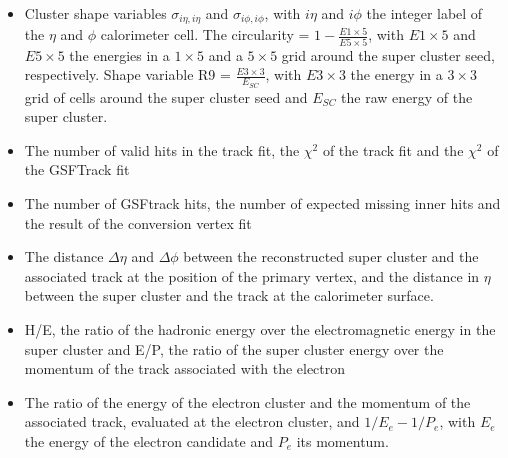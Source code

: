 \begin{itemize}
\setlength{\itemsep}{-\baselineskip}
\item Cluster shape variables $\sigma_{i\eta,i\eta}$ and $\sigma_{i\phi,i\phi}$, with $i\eta$ and $i\phi$ the integer
label of the $\eta$ and $\phi$ calorimeter cell. The circularity =  $1 -\frac{E1\times5}{E5\times5}$, with
$E1\times5$ and $E5\times5$ the energies in a $1\times5$ and a $5\times5$ grid around the super cluster seed,
respectively. Shape variable R9 = $\frac{E3\times3}{E_{SC}}$, with $E3\times3$ the energy in a $3\times3$ grid
of cells around the super cluster seed and $E_{SC}$ the raw energy of the super cluster.
\item The number of valid hits in the track fit, the $\chi^2$ of the track fit and the $\chi^2$ of the GSFTrack fit
\item The number of GSFtrack hits, the number of expected missing inner hits and the result of the conversion vertex fit
\item The distance $\Delta \eta$ and $\Delta \phi$ between the reconstructed super cluster and the associated track at the position of the primary vertex, and the distance in $\eta$ between the super cluster and the track at the calorimeter surface.
\item H/E, the ratio of the hadronic energy over the electromagnetic energy in the super cluster and E/P, the ratio of the super cluster energy over the momentum of the track associated with the electron
\item The ratio of the energy of the electron cluster and the momentum of the associated track, evaluated at the electron cluster,
 and $1/E_e - 1/P_e$, with $E_e$ the energy of the electron candidate and $P_e$ its momentum.
\end{itemize}

